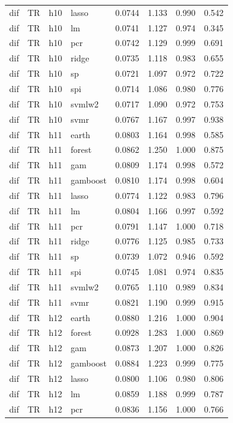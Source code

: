 \begin{ThreePartTable}
\begin{longtable}[t]{llclcccc}
dif & TR & h10 & lasso & 0.0744 & 1.133 & 0.990 & 0.542\\
dif & TR & h10 & lm & 0.0741 & 1.127 & 0.974 & 0.345\\
dif & TR & h10 & pcr & 0.0742 & 1.129 & 0.999 & 0.691\\
dif & TR & h10 & ridge & 0.0735 & 1.118 & 0.983 & 0.655\\
dif & TR & h10 & sp & 0.0721 & 1.097 & 0.972 & 0.722\\
dif & TR & h10 & spi & 0.0714 & 1.086 & 0.980 & 0.776\\
dif & TR & h10 & svmlw2 & 0.0717 & 1.090 & 0.972 & 0.753\\
dif & TR & h10 & svmr & 0.0767 & 1.167 & 0.997 & 0.938\\
\addlinespace
dif & TR & h11 & earth & 0.0803 & 1.164 & 0.998 & 0.585\\
dif & TR & h11 & forest & 0.0862 & 1.250 & 1.000 & 0.875\\
dif & TR & h11 & gam & 0.0809 & 1.174 & 0.998 & 0.572\\
dif & TR & h11 & gamboost & 0.0810 & 1.174 & 0.998 & 0.604\\
dif & TR & h11 & lasso & 0.0774 & 1.122 & 0.983 & 0.796\\
dif & TR & h11 & lm & 0.0804 & 1.166 & 0.997 & 0.592\\
dif & TR & h11 & pcr & 0.0791 & 1.147 & 1.000 & 0.718\\
dif & TR & h11 & ridge & 0.0776 & 1.125 & 0.985 & 0.733\\
dif & TR & h11 & sp & 0.0739 & 1.072 & 0.946 & 0.592\\
dif & TR & h11 & spi & 0.0745 & 1.081 & 0.974 & 0.835\\
dif & TR & h11 & svmlw2 & 0.0765 & 1.110 & 0.989 & 0.834\\
dif & TR & h11 & svmr & 0.0821 & 1.190 & 0.999 & 0.915\\
\addlinespace
dif & TR & h12 & earth & 0.0880 & 1.216 & 1.000 & 0.904\\
dif & TR & h12 & forest & 0.0928 & 1.283 & 1.000 & 0.869\\
dif & TR & h12 & gam & 0.0873 & 1.207 & 1.000 & 0.826\\
dif & TR & h12 & gamboost & 0.0884 & 1.223 & 0.999 & 0.775\\
dif & TR & h12 & lasso & 0.0800 & 1.106 & 0.980 & 0.806\\
dif & TR & h12 & lm & 0.0859 & 1.188 & 0.999 & 0.787\\
dif & TR & h12 & pcr & 0.0836 & 1.156 & 1.000 & 0.766\\

\end{longtable}
\end{ThreePartTable}
